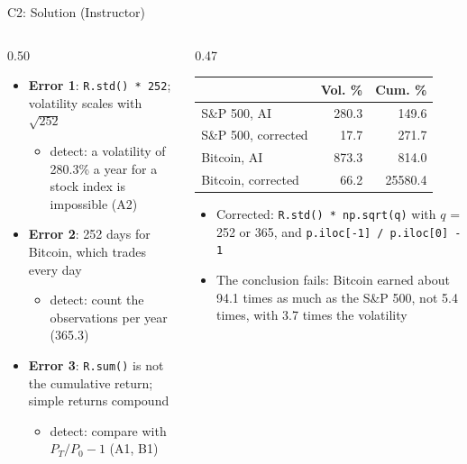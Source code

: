 \ifsolutions
\begin{frame}{C2: Solution (Instructor)}
\itemsize{\footnotesize}
\begin{columns}[T]
\begin{column}{0.50\textwidth}
\begin{itemize}
    \item \textbf{Error 1}: \texttt{R.std() * 252}; volatility scales with $\sqrt{252}$
    \begin{itemize}
        \item detect: a volatility of 280.3\% a year for a stock index is impossible (A2)
    \end{itemize}
    \item \textbf{Error 2}: 252 days for Bitcoin, which trades every day
    \begin{itemize}
        \item detect: count the observations per year (365.3)
    \end{itemize}
    \item \textbf{Error 3}: \texttt{R.sum()} is not the cumulative return; simple returns compound
    \begin{itemize}
        \item detect: compare with $P_T/P_0 - 1$ (A1, B1)
    \end{itemize}
\end{itemize}
\end{column}
\begin{column}{0.47\textwidth}
\begin{center}
\footnotesize
\begin{tabular}{lrr}
\toprule
& Vol. \% & Cum. \% \\
\midrule
S\&P 500, AI & 280.3 & 149.6 \\
S\&P 500, corrected & 17.7 & 271.7 \\
Bitcoin, AI & 873.3 & 814.0 \\
Bitcoin, corrected & 66.2 & 25580.4 \\
\bottomrule
\end{tabular}
\end{center}
\begin{itemize}
    \item Corrected: \texttt{R.std() * np.sqrt(q)} with $q$ = 252 or 365, and \texttt{p.iloc[-1] / p.iloc[0] - 1}
    \item The conclusion fails: Bitcoin earned about 94.1 times as much as the S\&P 500, not 5.4 times, with 3.7 times the volatility
\end{itemize}
\end{column}
\end{columns}
\end{frame}
\fi


